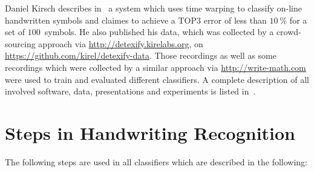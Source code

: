 \documentclass[9pt,technote]{IEEEtran}
\begin{document}
Daniel Kirsch describes in~\cite{Kirsch} a system which uses time warping to
classify on-line handwritten symbols and claimes to achieve a TOP3 error of
less than $\SI{10}{\percent}$ for a set of $\num{100}$~symbols. He also
published his data, which was collected by a crowd-sourcing approach via
\url{http://detexify.kirelabs.org}, on
\url{https://github.com/kirel/detexify-data}. Those recordings as well as
some recordings which were collected by a similar approach via
\url{http://write-math.com} were used to train and evaluated different
classifiers. A complete description of all involved software, data,
presentations and experiments is listed in~\cite{Thoma:2014}.

\section{Steps in Handwriting Recognition}
The following steps are used in all classifiers which are described in the
following:
\end{document}
